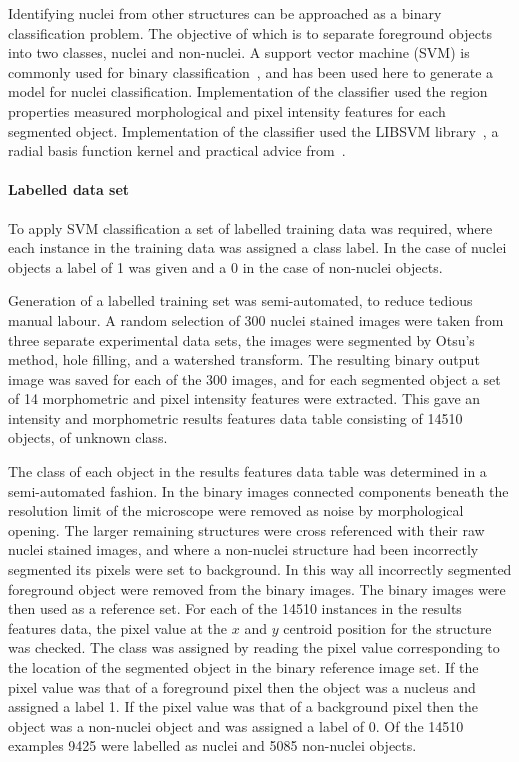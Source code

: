 Identifying nuclei from other structures can be approached as a binary classification problem. The objective of which is to separate foreground objects into two classes, nuclei and non-nuclei. A support vector machine (SVM) is commonly used for binary classification~\cite{Cortes1995}, and has been used here to generate a model for nuclei classification. Implementation of the classifier used the region properties measured morphological and pixel intensity features for each segmented object. Implementation of the classifier used the LIBSVM library~\cite{Chang2011}, a radial basis function kernel and practical advice from~\cite{Hsu2008}.

\paragraph{Labelled data set}
To apply SVM classification a set of labelled training data was required, where each instance in the training data was assigned a class label. In the case of nuclei objects a label of 1 was given and a 0 in the case of non-nuclei objects.

Generation of a labelled training set was semi-automated, to reduce tedious manual labour. A random selection of 300 nuclei stained images were taken from three separate experimental data sets, the images were segmented by Otsu's method, hole filling, and a watershed transform. The resulting binary output image was saved for each of the 300 images, and for each segmented object a set of 14 morphometric and pixel intensity features were extracted. This gave an intensity and morphometric results features data table consisting of 14510 objects, of unknown class.

The class of each object in the results features data table was determined in a semi-automated fashion. In the binary images connected components beneath the resolution limit of the microscope were removed as noise by morphological opening. The larger remaining structures were cross referenced with their raw nuclei stained images, and where a non-nuclei structure had been incorrectly segmented its pixels were set to background. In this way all incorrectly segmented foreground object were removed from the binary images. The binary images were then used as a reference set. For each of the 14510 instances in the results features data, the pixel value at the $x$ and $y$ centroid position for the structure was checked. The class was assigned by reading the pixel value corresponding to the location of the segmented object in the binary reference image set. If the pixel value was that of a foreground pixel then the object was a nucleus and assigned a label 1. If the pixel value was that of a background pixel then the object was a non-nuclei object and was assigned a label of 0. Of the 14510 examples 9425 were labelled as nuclei and 5085 non-nuclei objects.

